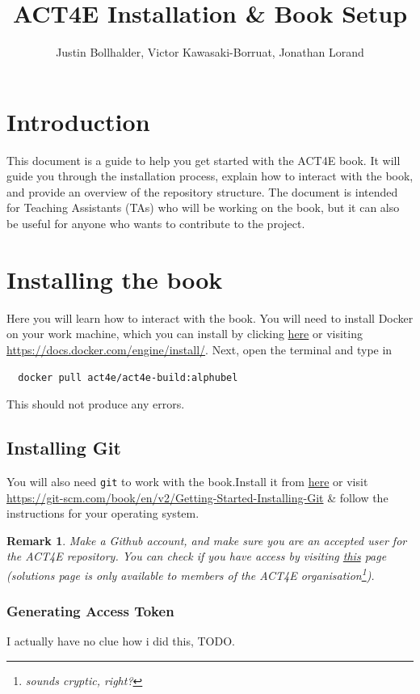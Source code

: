 \documentclass{article}
\title{ACT4E Installation \& Book Setup}
\author{ Justin Bollhalder, Victor Kawasaki-Borruat, Jonathan Lorand}
\newtheorem{remark}{Remark}
\begin{document}
\maketitle

\tableofcontents

\section{Introduction}
This document is a guide to help you get started with the ACT4E book. It will guide you through the installation process, explain how to interact with the book, and provide an overview of the repository structure. The document is intended for Teaching Assistants (TAs) who will be working on the book, but it can also be useful for anyone who wants to contribute to the project.

\section{Installing the book}
Here you will learn how to interact with the book. You will need to install Docker on your work machine, which you can install by clicking  \href{https://docs.docker.com/engine/install/}{here} or visiting \url{https://docs.docker.com/engine/install/}. Next, open the terminal and type in
\begin{verbatim}
  docker pull act4e/act4e-build:alphubel
\end{verbatim}
This should not produce any errors.


\subsection{Installing Git}
You will also need \texttt{git} to work with the book.Install it from \href{https://git-scm.com/book/en/v2/Getting-Started-Installing-Git}{here} or visit \url{https://git-scm.com/book/en/v2/Getting-Started-Installing-Git} \& follow the instructions for your operating system.

\begin{remark}
    Make a Github account, and make sure you are an accepted user for the ACT4E repository. You can check if you have access by visiting \href{https://github.com/ACT4E/ACT4E-solutions}{this} page (solutions page is only available to members of the ACT4E organisation\footnote{sounds cryptic, right?}).
\end{remark}

\subsubsection{Generating Access Token}
I actually have no clue how i did this, TODO.
\end{document}
